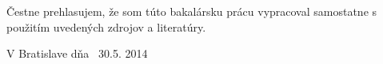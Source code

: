 Čestne prehlasujem, že som túto bakalársku prácu vypracoval samostatne s použitím uvedených zdrojov a literatúry.

\null
\vfill
V Bratislave dňa \
30.5. 2014

